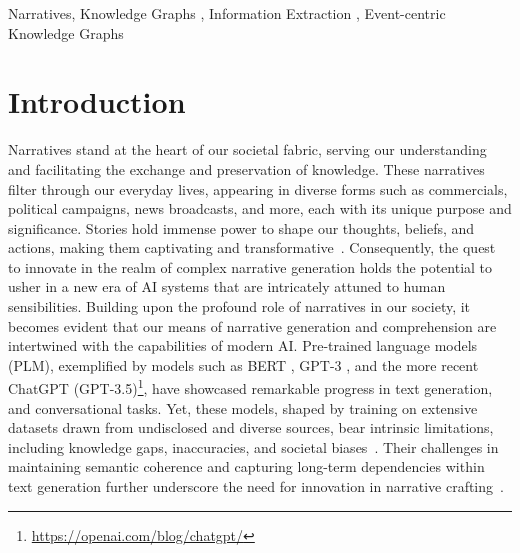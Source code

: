 \documentclass[
]{ceurart}
\begin{document}
\begin{keywords}
	Narratives\sep
	Knowledge Graphs \sep
	Information Extraction  \sep
	Event-centric Knowledge Graphs
\end{keywords}

\maketitle

\section{Introduction}
\label{sec:introduction}
Narratives stand at the heart of our societal fabric, serving our understanding and facilitating the exchange and preservation of knowledge. These narratives filter through our everyday lives, appearing in diverse forms such as commercials, political campaigns, news broadcasts, and more, each with its unique purpose and significance.
Stories hold immense power to shape our thoughts, beliefs, and actions, making them captivating and transformative~\cite{green2004understanding}. Consequently, the quest to innovate in the realm of complex narrative generation holds the potential to usher in a new era of AI systems that are intricately attuned to human sensibilities. Building upon the profound role of narratives in our society, it becomes evident that our means of narrative generation and comprehension are intertwined with the capabilities of modern AI. Pre-trained language models (PLM), exemplified by models such as BERT \cite{BERT}, GPT-3 \cite{GPT-3}, and the more recent ChatGPT (GPT-3.5)\footnote{\url{https://openai.com/blog/chatgpt/}}, have showcased remarkable progress in text generation, and conversational tasks. Yet, these models, shaped by training on extensive datasets drawn from undisclosed and diverse sources, bear intrinsic limitations, including knowledge gaps, inaccuracies, and societal biases~\cite{GPT-3,documenting_corpora}. Their challenges in maintaining semantic coherence and capturing long-term dependencies within text generation further underscore the need for innovation in narrative crafting~\cite{PLM_survey,semantic_coherence}.
\end{document}
